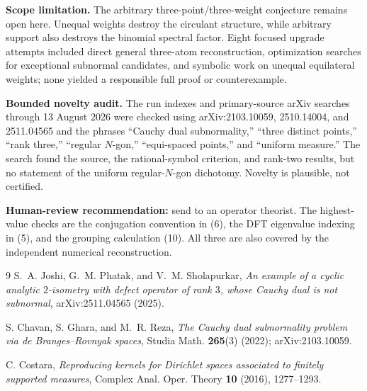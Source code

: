\documentclass[11pt]{article}
\begin{document}
\textbf{Scope limitation.}  The arbitrary three-point/three-weight conjecture
remains open here.  Unequal weights destroy the circulant structure, while
arbitrary support also destroys the binomial spectral factor.  Eight focused
upgrade attempts included direct general three-atom reconstruction,
optimization searches for exceptional subnormal candidates, and symbolic
work on unequal equilateral weights; none yielded a responsible full proof or
counterexample.

\textbf{Bounded novelty audit.}  The run indexes and primary-source arXiv
searches through 13 August 2026 were checked using arXiv:2103.10059,
2510.14004, and 2511.04565 and the phrases ``Cauchy dual subnormality,''
``three distinct points,'' ``rank three,'' ``regular $N$-gon,''
``equi-spaced points,'' and ``uniform measure.''  The search found the source,
the rational-symbol criterion, and rank-two results, but no statement of the
uniform regular-$N$-gon dichotomy.  Novelty is plausible, not certified.

\textbf{Human-review recommendation:} send to an operator theorist.  The
highest-value checks are the conjugation convention in (6), the DFT
eigenvalue indexing in (5), and the grouping calculation (10).  All three are
also covered by the independent numerical reconstruction.

\begin{thebibliography}{9}
S.~A. Joshi, G.~M. Phatak, and V.~M. Sholapurkar,
\emph{An example of a cyclic analytic $2$-isometry with defect operator of
rank $3$, whose Cauchy dual is not subnormal}, arXiv:2511.04565 (2025).

S. Chavan, S. Ghara, and M.~R. Reza,
\emph{The Cauchy dual subnormality problem via de Branges--Rovnyak spaces},
Studia Math. \textbf{265}(3) (2022); arXiv:2103.10059.

C. Costara, \emph{Reproducing kernels for Dirichlet spaces associated to
finitely supported measures}, Complex Anal. Oper. Theory \textbf{10} (2016),
1277--1293.
\end{thebibliography}
\end{document}
